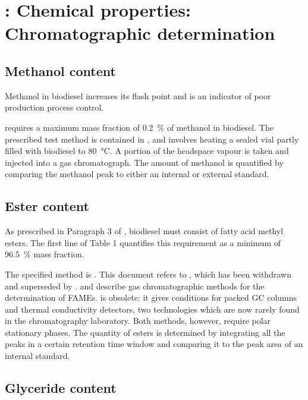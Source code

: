 \section{\texorpdfstring{}{SANS 1935}: Chemical properties: Chromatographic determination}
\label{sec:ChromDet}

\subsection{Methanol content}

Methanol in biodiesel increases its flash point and is an indicator of poor
production process control.

 requires a maximum mass fraction of \SI{0.2}{\percent} of
methanol in biodiesel. The prescribed test method is contained in , and involves heating a sealed vial partly filled with biodiesel to
\SI{80}{\celsius}. A portion of the headspace vapour is taken and injected into
a gas chromatograph. The amount of methanol is quantified by comparing the
methanol peak to either an internal or external standard.

\subsection{Ester content}
\label{sec:EsterContent}
As prescribed in Paragraph 3 of , biodiesel must consist of fatty
acid methyl esters. The first line of Table 1 quantifies this requirement as a
minimum of \SI{96.5}{\percent} mass fraction.

The specified method is . This document refers to , which has been withdrawn and superseded by .
 and  describe gas chromatographic methods for the
determination of FAMEs.  is obsolete: it gives conditions for
packed GC columns and thermal conductivity detectors, two technologies which are
now rarely found in the chromatography laboratory. Both methods, however,
require polar stationary phases. The quantity of esters is determined by
integrating all the peaks in a certain retention time window and comparing it to
the peak area of an internal standard.

\subsection{Glyceride content}
\label{sec:Glycerides}


